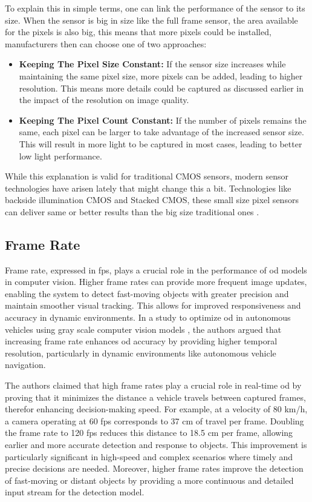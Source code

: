 To explain this in simple terms, one can link the performance of the sensor to its size. When the sensor is big in size like the full frame sensor, the area available for the pixels is also big, this means that more pixels could be installed, manufacturers then can choose one of two approaches:
\begin{itemize}
    \item \textbf{Keeping The Pixel Size Constant:} If the sensor size increases while maintaining the same pixel size, more pixels can be added, leading to higher resolution. This means more details could be captured as discussed earlier in the impact of the resolution on image quality.
    \item \textbf{Keeping The Pixel Count Constant:} If the number of pixels remains the same, each pixel can be larger to take advantage of the increased sensor size. This will result in more light to be captured in most cases, leading to better low light performance.
\end{itemize}


While this explanation is valid for traditional CMOS sensors, modern sensor technologies have arisen lately that might change this a bit. Technologies like backside illumination CMOS and Stacked CMOS, these small size pixel sensors can deliver same or better results than the big size traditional ones \cite{Fisher_CMOS_Types_2024}.

\subsection{Frame Rate}

Frame rate, expressed in \gls{fps}, plays a crucial role in the performance of \gls{od} models in computer vision. Higher frame rates can provide more frequent image updates, enabling the system to detect fast-moving objects with greater precision and maintain smoother visual tracking. This allows for improved responsiveness and accuracy in dynamic environments. In a study to optimize \gls{od} in autonomous vehicles using gray scale computer vision models \cite{FPS}, the authors argued that increasing frame rate enhances \gls{od} accuracy by providing higher temporal resolution, particularly in dynamic environments like autonomous vehicle navigation.

The authors claimed that high frame rates play a crucial role in real-time \gls{od} by proving that it  minimizes the distance a vehicle travels between captured frames, therefor enhancing decision-making speed. For example, at a velocity of 80 km/h, a camera operating at 60 \gls{fps} corresponds to 37 cm of travel per frame. Doubling the frame rate to 120 \gls{fps} reduces this distance to 18.5 cm per frame, allowing earlier and more accurate detection and response to objects. This improvement is particularly significant in high-speed and complex scenarios where timely and precise decisions are needed. Moreover, higher frame rates improve the detection of fast-moving or distant objects by providing a more continuous and detailed input stream for the detection model.

